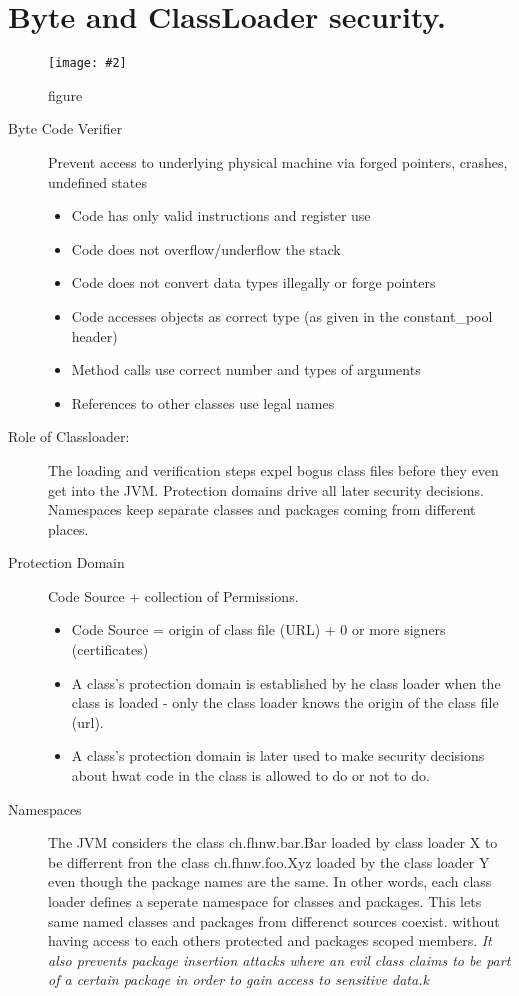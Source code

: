 \documentclass[a4paper,10pt]{scrreprt}
\newcommand{\pic}[2][figure]{\begin{figure}[h]
 \centering
 \texttt{[image: \#2]}
 \caption{#1}
\end{figure}
}
\begin{document}
\chapter{Byte and ClassLoader security.}
\pic{classformj.png}
\begin{description}
 \item [Byte Code Verifier] Prevent access to underlying physical machine via forged
pointers, crashes, undefined states
\begin{itemize}
 \item  Code has only valid instructions and register use
\item Code does not overflow/underflow the stack
\item Code does not convert data types illegally or forge pointers
\item Code accesses objects as correct type (as given in the constant\_pool
header)
\item Method calls use correct number and types of arguments
\item References to other classes use legal names
\end{itemize}
\item[Role of Classloader:] The loading and verification steps expel bogus class files before
they even get into the JVM. Protection domains drive all later security decisions. Namespaces keep separate classes and 
packages coming from different places.
\item[Protection Domain] Code Source + collection of Permissions.
\begin{itemize}
 \item Code Source = origin of class file (URL) + 0 or more signers (certificates)
 \item A class's protection domain is established by he class loader when the class is loaded - only the class loader 
knows the origin of the class file (url).
\item A class's protection domain is later used to make security decisions about hwat code in the class is allowed to 
do or not to do.

\end{itemize}
\item[Namespaces] The JVM considers the class ch.fhnw.bar.Bar loaded by class loader X to be differrent fron the class 
ch.fhnw.foo.Xyz loaded by the class loader Y even though the package names are the same. In other words, each class 
loader defines a seperate namespace for classes and packages. This lets same named classes and packages from differenct 
sources coexist. without having access to each others protected and packages scoped members. \textit{It also prevents 
package insertion attacks where an evil class claims to be part of a certain package in order to gain access to 
sensitive data.k}
\end{description}
\end{document}
